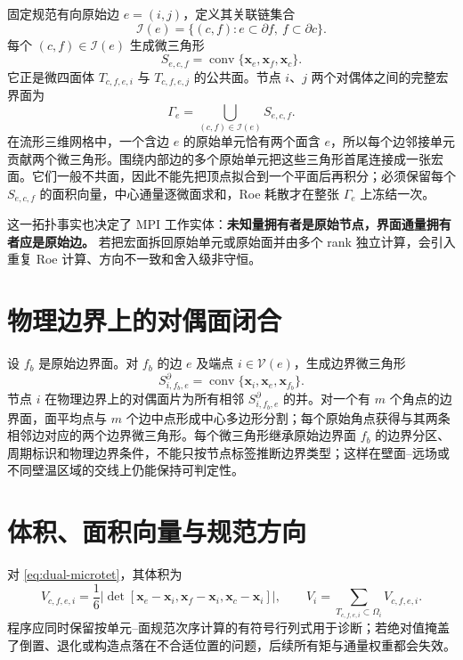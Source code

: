 \documentclass[UTF8,a4paper,11pt,openany]{ctexrep}
\numberwithin{equation}{chapter}
\begin{document}
固定规范有向原始边 $e=(i,j)$，定义其关联链集合
\begin{equation}
  \mathcal I(e)=\{(c,f):e\subset\partial f,\ f\subset\partial c\}.
\end{equation}
每个 $(c,f)\in\mathcal I(e)$ 生成微三角形
\begin{equation}
  S_{e,c,f}=\operatorname{conv}\{\bm x_e,\bm x_f,\bm x_c\}.
  \label{eq:dual-microface}
\end{equation}
它正是微四面体 $T_{c,f,e,i}$ 与 $T_{c,f,e,j}$ 的公共面。节点 $i$、$j$ 两个对偶体之间的完整宏界面为
\begin{equation}
  \boxed{\Gamma_e=\bigcup_{(c,f)\in\mathcal I(e)}S_{e,c,f}.}
  \label{eq:dual-macroface}
\end{equation}
在流形三维网格中，一个含边 $e$ 的原始单元恰有两个面含 $e$，所以每个边邻接单元贡献两个微三角形。围绕内部边的多个原始单元把这些三角形首尾连接成一张宏面。它们一般不共面，因此不能先把顶点拟合到一个平面后再积分；必须保留每个 $S_{e,c,f}$ 的面积向量，中心通量逐微面求和，Roe 耗散才在整张 $\Gamma_e$ 上冻结一次。

这一拓扑事实也决定了 MPI 工作实体：\textbf{未知量拥有者是原始节点，界面通量拥有者应是原始边。} 若把宏面拆回原始单元或原始面并由多个 rank 独立计算，会引入重复 Roe 计算、方向不一致和舍入级非守恒。

\section{物理边界上的对偶面闭合}

设 $f_b$ 是原始边界面。对 $f_b$ 的边 $e$ 及端点 $i\in\mathcal V(e)$，生成边界微三角形
\begin{equation}
  S^{\partial}_{i,f_b,e}
  =\operatorname{conv}\{\bm x_i,\bm x_e,\bm x_{f_b}\}.
  \label{eq:dual-boundary-triangle}
\end{equation}
节点 $i$ 在物理边界上的对偶面片为所有相邻 $S^{\partial}_{i,f_b,e}$ 的并。对一个有 $m$ 个角点的边界面，面平均点与 $m$ 个边中点形成中心多边形分割；每个原始角点获得与其两条相邻边对应的两个边界微三角形。每个微三角形继承原始边界面 $f_b$ 的边界分区、周期标识和物理边界条件，不能只按节点标签推断边界类型；这样在壁面--远场或不同壁温区域的交线上仍能保持可判定性。

\section{体积、面积向量与规范方向}

对 \cref{eq:dual-microtet}，其体积为
\begin{equation}
  V_{c,f,e,i}=\frac16\left|
    \det\left[
      \bm x_e-\bm x_i,
      \bm x_f-\bm x_i,
      \bm x_c-\bm x_i
    \right]
  \right|,
  \qquad
  V_i=\sum_{T_{c,f,e,i}\subset\Omega_i}V_{c,f,e,i}.
  \label{eq:dual-volume}
\end{equation}
程序应同时保留按单元--面规范次序计算的有符号行列式用于诊断；若绝对值掩盖了倒置、退化或构造点落在不合适位置的问题，后续所有矩与通量权重都会失效。
\end{document}
